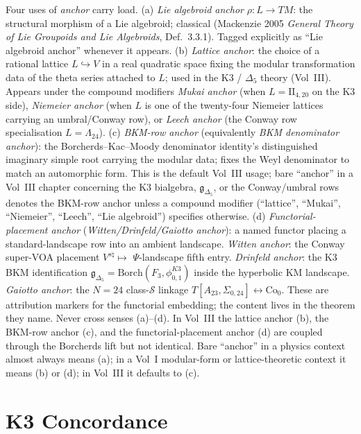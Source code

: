 \begin{description}[itemsep=4pt, leftmargin=2.0em, style=nextline]
\item[T20 (``anchor''--four distinct usages).]
%
Four uses of \emph{anchor} carry load.
(a) \emph{Lie algebroid anchor} $\rho\colon L \to TM$: the
structural morphism of a Lie algebroid; classical
(Mackenzie 2005 \emph{General Theory of Lie Groupoids and Lie
Algebroids}, Def.~3.3.1). Tagged explicitly as
``Lie algebroid anchor'' whenever it appears.
(b) \emph{Lattice anchor}: the choice of a rational lattice
$L \hookrightarrow V$ in a real quadratic space fixing the modular
transformation data of the theta series attached to $L$; used in
the K3 / $\Delta_5$ theory (Vol~III). Appears under the
compound modifiers \emph{Mukai anchor} (when $L = \mathrm{II}_{4,20}$
on the K3 side), \emph{Niemeier anchor} (when $L$ is one of the
twenty-four Niemeier lattices carrying an umbral/Conway row),
or \emph{Leech anchor} (the Conway row specialisation
$L = \Lambda_{24}$).
(c) \emph{BKM-row anchor} (equivalently \emph{BKM denominator
anchor}): the Borcherds--Kac--Moody denominator identity's
distinguished imaginary simple root carrying the modular data;
fixes the Weyl denominator to match an automorphic form. This
is the default Vol~III usage; bare ``anchor'' in a Vol~III
chapter concerning the K3 bialgebra, $\mathfrak{g}_{\Delta_5}$,
or the Conway/umbral rows denotes the BKM-row anchor unless a
compound modifier (``lattice'', ``Mukai'', ``Niemeier'',
``Leech'', ``Lie algebroid'') specifies otherwise.
(d) \emph{Functorial-placement anchor}
(\emph{Witten/Drinfeld/Gaiotto anchor}): a named functor placing
a standard-landscape row into an ambient landscape. \emph{Witten
anchor}: the Conway super-VOA placement $V^{s\natural} \mapsto$
$\Psi$-landscape fifth entry. \emph{Drinfeld anchor}: the K3 BKM
identification $\mathfrak{g}_{\Delta_5} = \mathrm{Borch}(F_3,
\phi_{0,1}^{K3})$ inside the hyperbolic KM landscape.
\emph{Gaiotto anchor}: the $N = 24$ class-$\mathcal S$ linkage
$T[A_{23}, \Sigma_{0,24}] \leftrightarrow \mathrm{Co}_0$. These
are attribution markers for the functorial embedding; the content
lives in the theorem they name.
Never cross senses (a)--(d). In Vol~III the lattice anchor (b),
the BKM-row anchor (c), and the functorial-placement anchor (d)
are coupled through the Borcherds lift but not identical. Bare
``anchor'' in a physics context almost always means (a); in a
Vol~I modular-form or lattice-theoretic context it means (b) or
(d); in Vol~III it defaults to (c).
\end{description}

\section{K3 Concordance}
\label{sec:concord-supplement}


